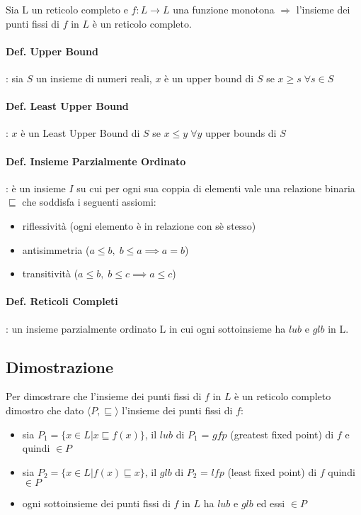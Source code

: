\documentclass{article}
\begin{document}
Sia L un reticolo completo e $f:L \to L$ una funzione monotona $\Rightarrow$ l'insieme dei punti fissi di $f$ in $L$ è un reticolo completo.

\paragraph{Def. Upper Bound}: sia $S$ un insieme di numeri reali, $x$ è un upper bound di $S$ se $x \geq s \;\forall s \in S$ 

\paragraph{Def. Least Upper Bound}: $x$ è un Least Upper Bound di $S$ se $x \leq y \; \forall y $ upper bounds di $S$

\paragraph{Def. Insieme Parzialmente Ordinato}: è un insieme $I$ su cui per ogni sua coppia di elementi vale una relazione binaria $\sqsubseteq$ che soddisfa i seguenti assiomi:
\begin{itemize}
\item riflessività (ogni elemento è in relazione con sè stesso)
\item antisimmetria ($a \leq b, \; b \leq a \implies a=b$)
\item transitività ($a \leq b, \; b \leq c \implies a \leq c$)
\end{itemize}



\paragraph{Def. Reticoli Completi}: un insieme parzialmente ordinato L in cui ogni sottoinsieme ha $lub$ e $glb$ in L.

\subsection{Dimostrazione}
Per dimostrare che l'insieme dei punti fissi di $f$ in $L$ è un reticolo completo dimostro che dato $\langle P,\sqsubseteq\rangle$ l'insieme dei punti fissi di $f$:
\begin{itemize}
    \item sia $P_1 =\{x \in L | x  \sqsubseteq f(x)\}$, il $lub$ di $P_1$ = $gfp$ (greatest fixed point) di $f$ e quindi $\in P$
    \item sia $P_2 =\{x \in L | f(x)  \sqsubseteq x\}$, il $glb$ di $P_2$ = $lfp$ (least fixed point) di $f$ quindi $\in P$
    \item ogni sottoinsieme dei punti fissi di $f$ in $L$ ha $lub$ e $glb$ ed essi $\in P$
\end{itemize}
\end{document}
